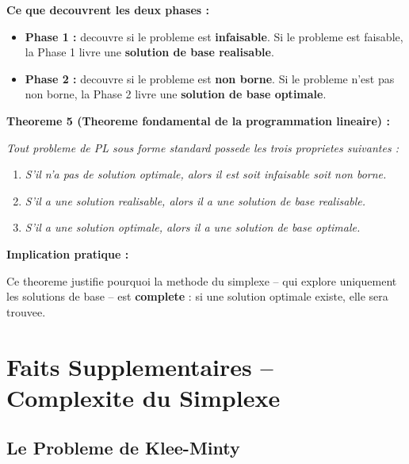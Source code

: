 \documentclass[12pt,a4paper]{article}
\begin{document}
\begin{important}
\textbf{Ce que decouvrent les deux phases :}

\begin{itemize}
    \item \textbf{Phase 1 :} decouvre si le probleme est \textcolor{importantrouge}{\textbf{infaisable}}. Si le probleme est faisable, la Phase 1 livre une \textcolor{defvert}{\textbf{solution de base realisable}}.
    \item \textbf{Phase 2 :} decouvre si le probleme est \textcolor{importantrouge}{\textbf{non borne}}. Si le probleme n'est pas non borne, la Phase 2 livre une \textcolor{defvert}{\textbf{solution de base optimale}}.
\end{itemize}
\end{important}

\begin{theoreme}
\textbf{Theoreme 5 (Theoreme fondamental de la programmation lineaire) :}

\textit{Tout probleme de PL sous forme standard possede les trois proprietes suivantes :}
\begin{enumerate}
    \item \textit{S'il n'a pas de solution optimale, alors il est soit infaisable soit non borne.}
    \item \textit{S'il a une solution realisable, alors il a une \textcolor{defvert}{solution de base realisable}.}
    \item \textit{S'il a une solution optimale, alors il a une \textcolor{titrebleu}{solution de base optimale}.}
\end{enumerate}
\end{theoreme}

\begin{astuce}
\textbf{Implication pratique :}

Ce theoreme justifie pourquoi la methode du simplexe -- qui explore uniquement les solutions de base -- est \textcolor{defvert}{\textbf{complete}} : si une solution optimale existe, elle sera trouvee.
\end{astuce}

\section{Faits Supplementaires -- Complexite du Simplexe}

\subsection{Le Probleme de Klee-Minty}
\end{document}
